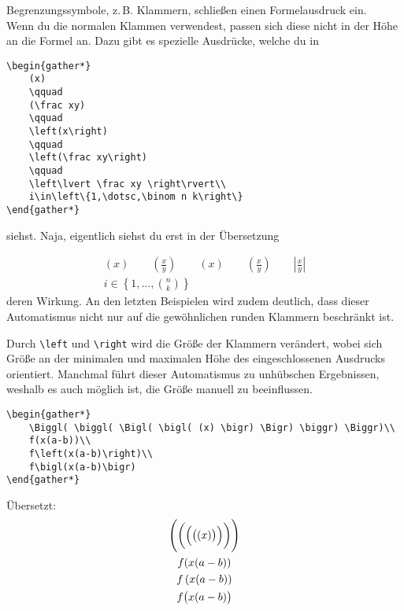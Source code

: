 Begrenzungssymbole, z.\,B. Klammern, schließen einen Formelausdruck ein.\\
Wenn du die normalen Klammen verwendest, passen sich diese nicht in der Höhe an die Formel an. Dazu gibt es spezielle Ausdrücke, welche du in

\begin{lstlisting}
\begin{gather*}
	(x)
	\qquad
	(\frac xy)
	\qquad
	\left(x\right)
	\qquad
	\left(\frac xy\right)
	\qquad
	\left\lvert \frac xy \right\rvert\\
	i\in\left\{1,\dotsc,\binom n k\right\}
\end{gather*}
\end{lstlisting} 

siehst. Naja, eigentlich siehst du erst in der Übersetzung

\begin{gather*}
	(x)
	\qquad
	(\frac xy)
	\qquad
	\left(x\right)
	\qquad
	\left(\frac xy\right)
	\qquad
	\left\lvert \frac xy \right\rvert\\
	i\in\left\{1,\dotsc,\binom n k\right\}
\end{gather*}
deren Wirkung. An den letzten Beispielen wird zudem deutlich, dass dieser Automatismus nicht nur auf die gewöhnlichen runden Klammern beschränkt ist.

Durch \verb|\left| und \verb|\right| wird die Größe der Klammern verändert, wobei sich Größe an der minimalen und maximalen Höhe des eingeschlossenen Ausdrucks orientiert. Manchmal führt dieser Automatismus zu unhübschen Ergebnissen, weshalb es auch möglich ist, die Größe manuell zu beeinflussen.

\begin{lstlisting}
\begin{gather*}
	\Biggl( \biggl( \Bigl( \bigl( (x) \bigr) \Bigr) \biggr) \Biggr)\\
	f(x(a-b))\\
	f\left(x(a-b)\right)\\
	f\bigl(x(a-b)\bigr)
\end{gather*}
\end{lstlisting} 

Übersetzt:
\begin{gather*}
	\Biggl( \biggl( \Bigl( \bigl( (x) \bigr) \Bigr) \biggr) \Biggr)\\
	f(x(a-b))\\
	f\left(x(a-b)\right)\\
	f\bigl(x(a-b)\bigr)
\end{gather*}

